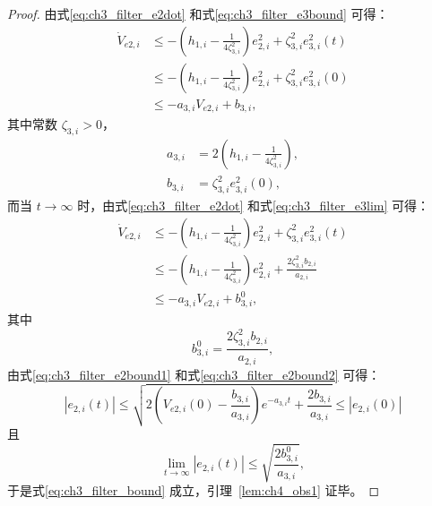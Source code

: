 \begin{proof}
由式\eqref{eq:ch3_filter_e2dot} 和式\eqref{eq:ch3_filter_e3bound} 可得：
\begin{equation}\label{eq:ch3_filter_e2bound1}
\begin{aligned}
\dot V_{e2,i}
&\le -\left(h_{1,i}-\frac{1}{4\zeta_{3,i}^2}\right)e_{2,i}^2+\zeta_{3,i}^2 e_{3,i}^2(t)\\
&\le -\left(h_{1,i}-\frac{1}{4\zeta_{3,i}^2}\right)e_{2,i}^2+\zeta_{3,i}^2 e_{3,i}^2(0)\\
&\le -a_{3,i}V_{e2,i}+b_{3,i},
\end{aligned}
\end{equation}
其中常数 $\zeta_{3,i}>0$，
\begin{subequations}
\begin{align}
a_{3,i}&=2\left(h_{1,i}-\frac{1}{4\zeta_{3,i}^2}\right),\\
b_{3,i}&=\zeta_{3,i}^2e_{3,i}^2(0),
\end{align}
\end{subequations}
而当 $t\to\infty$ 时，由式\eqref{eq:ch3_filter_e2dot} 和式\eqref{eq:ch3_filter_e3lim} 可得：
\begin{equation}\label{eq:ch3_filter_e2bound2}
\begin{aligned}
\dot V_{e2,i}
&\le -\left(h_{1,i}-\frac{1}{4\zeta_{3,i}^2}\right)e_{2,i}^2+\zeta_{3,i}^2 e_{3,i}^2(t)\\
&\le -\left(h_{1,i}-\frac{1}{4\zeta_{3,i}^2}\right)e_{2,i}^2+\frac{2\zeta_{3,i}^2b_{2,i}}{a_{2,i}}\\
&\le -a_{3,i}V_{e2,i}+b_{3,i}^{0},
\end{aligned}
\end{equation}
其中
\begin{equation}
b_{3,i}^{0}=\frac{2\zeta_{3,i}^2b_{2,i}}{a_{2,i}},
\end{equation}
由式\eqref{eq:ch3_filter_e2bound1} 和式\eqref{eq:ch3_filter_e2bound2} 可得：
\begin{equation}
|e_{2,i}(t)|
\le
\sqrt{2\left(V_{e2,i}(0)-\frac{b_{3,i}}{a_{3,i}}\right)e^{-a_{3,i}t}+\frac{2b_{3,i}}{a_{3,i}}}
\le |e_{2,i}(0)|
\end{equation}
且
\begin{equation}\label{eq:ch4_ws_bound}
\lim_{t\to\infty}|e_{2,i}(t)|
\le
\sqrt{\frac{2b_{3,i}^{0}}{a_{3,i}}},
\end{equation}
于是式\eqref{eq:ch3_filter_bound} 成立，引理~\ref{lem:ch4_obs1} 证毕。
\end{proof}

